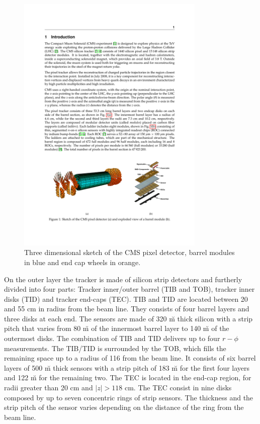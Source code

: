 \begin{figure}
\begin{center}
\includegraphics[angle=-0,width=0.8\textwidth]{2_LHC_and_CMS/pics/pixelfull.pdf}
\caption{Three dimensional sketch of the CMS pixel detector, barrel modules in blue and end cap wheels in orange.
\label{fig:pixel}
}
\end{center}
\end{figure}

On the outer layer the tracker is made of silicon strip detectors and furtherly divided into four parts: Tracker inner/outer barrel (TIB and TOB), tracker inner disks (TID) and tracker end-caps (TEC). TIB and TID are located between 20 and 55 cm in radius from the beam line. They consists of four barrel layers and three disks at each end. The sensors are made of 320 \u m thick silicon with a strip pitch that varies from 80 \u m of the innermost barrel layer to 140 \u m of the outermost disks. The combination of TIB and TID delivers up to four $r-\phi$ measurements. The TIB/TID is surrounded by the TOB, which fills the remaining space up to a radius of 116 from the beam line. It consists of six barrel layers of 500 \u m thick sensors with a strip pitch of 183 \u m for the first four layers and 122 \u m for the remaining two. The TEC is located in the end-cap region, for radii greater than 20 cm and $|z| > 118$ cm. The TEC consist in nine disks composed by up to seven concentric rings of strip sensors. The thickness and the strip pitch of the sensor varies depending on the distance of the ring from the beam line. 

